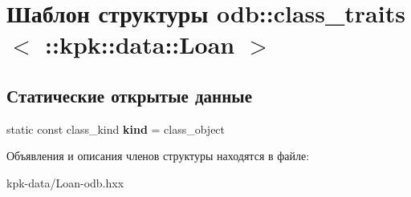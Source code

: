 \hypertarget{structodb_1_1class__traits_3_01_1_1kpk_1_1data_1_1_loan_01_4}{}\section{Шаблон структуры odb\+:\+:class\+\_\+traits$<$ \+:\+:kpk\+:\+:data\+:\+:Loan $>$}
\label{structodb_1_1class__traits_3_01_1_1kpk_1_1data_1_1_loan_01_4}
\subsection*{Статические открытые данные}
\begin{DoxyCompactItemize}
\item 
static const class\+\_\+kind {\bfseries kind} = class\+\_\+object\hypertarget{structodb_1_1class__traits_3_01_1_1kpk_1_1data_1_1_loan_01_4_ae5061a60dfa15b2385d766d8cb6cd72f}{}\label{structodb_1_1class__traits_3_01_1_1kpk_1_1data_1_1_loan_01_4_ae5061a60dfa15b2385d766d8cb6cd72f}

\end{DoxyCompactItemize}


Объявления и описания членов структуры находятся в файле\+:\begin{DoxyCompactItemize}
\item 
kpk-\/data/Loan-\/odb.\+hxx\end{DoxyCompactItemize}

